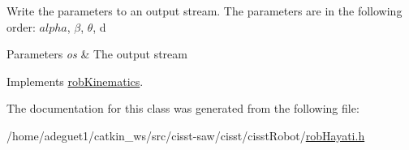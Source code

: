 Write the parameters to an output stream. The parameters are in the following order\-: $alpha$, $\beta$, $\theta$, d 
\begin{DoxyParams}{Parameters}
{\em os} & The output stream \\
\hline
\end{DoxyParams}


Implements \hyperlink{classrob_kinematics_afbfe67b8baaed6fdee85bef681f195e1}{rob\-Kinematics}.



The documentation for this class was generated from the following file\-:\begin{DoxyCompactItemize}
\item 
/home/adeguet1/catkin\-\_\-ws/src/cisst-\/saw/cisst/cisst\-Robot/\hyperlink{rob_hayati_8h}{rob\-Hayati.\-h}\end{DoxyCompactItemize}
